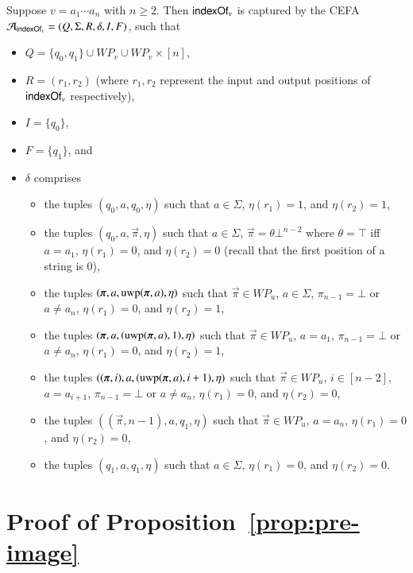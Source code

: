 Suppose $v = a_1 \cdots a_n$ with $n \ge 2$. 
Then $\mathsf{indexOf}_v$ is captured by the CEFA $\mathcal{A}_{\mathsf{indexOf}_v}=(Q, \Sigma, R, \delta, I, F)$, such that 
\begin{itemize}
\item $Q = \{q_0, q_1\} \cup WP_v \cup WP_v \times [n]$, 
\item $R=(r_1, r_2)$ (where $r_1,r_2$ represent the input and output positions of $\mathsf{indexOf}_v$ respectively), 
\item $I=\{q_0\}$, 
\item $F=\{q_1\}$, and 
\item $\delta$ comprises 
\begin{itemize}
\item the tuples $(q_0, a, q_0, \eta)$ such that $a \in \Sigma$, $\eta(r_1)=1$, and $\eta(r_2) = 1$,
%
\item the tuples $(q_0, a, \vec{\pi}, \eta)$ such that $a \in \Sigma$, $\vec{\pi} = \theta \bot^{n-2}$ where $\theta  = \top$ iff $a = a_1$, $\eta(r_1) = 0$, and $\eta(r_2)= 0$ (recall that the first position of a string is $0$),
% 
\item the tuples  $(\vec{\pi}, a, \uwp(\vec{\pi}, a), \eta)$ such that $\vec{\pi} \in WP_u$, $a \in \Sigma$, $\pi_{n-1} = \bot$ or $a \neq a_{n}$, $\eta(r_1) = 0$, and $\eta(r_2)= 1$,
%
\item the tuples $(\vec{\pi}, a, (\uwp(\vec{\pi}, a), 1), \eta)$ such that $\vec{\pi} \in WP_u$, $a = a_1$, $\pi_{n-1} = \bot$ or $a \neq a_{n}$, $\eta(r_1) = 0$, and $\eta(r_2)= 1$,
%
\item the tuples $((\vec{\pi}, i),  a, (\uwp(\vec{\pi}, a), i+1), \eta)$ such that $\vec{\pi} \in WP_u$, $i \in [n-2]$, $a = a_{i+1}$, $\pi_{n-1} = \bot$ or $a \neq a_{n}$, $\eta(r_1) = 0$, and $\eta(r_2)= 0$,
%
\item the tuples $((\vec{\pi}, n-1),  a, q_1, \eta)$ such that $\vec{\pi} \in WP_u$, $a = a_{n}$, $\eta(r_1) =0$, and $\eta(r_2)= 0$,
%
\item the tuples  $(q_1, a, q_1, \eta)$ such that $a \in \Sigma$, $\eta(r_1) = 0$, and $\eta(r_2)= 0$.
\end{itemize}
\end{itemize}


\section{Proof of Proposition~\ref{prop:pre-image}}\label{app:pre-image}


